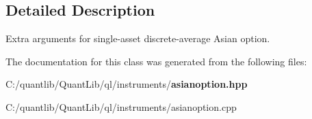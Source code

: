 \subsection{Detailed Description}
Extra arguments for single-\/asset discrete-\/average Asian option. 

The documentation for this class was generated from the following files\+:\begin{DoxyCompactItemize}
\item 
C\+:/quantlib/\+Quant\+Lib/ql/instruments/{\bf asianoption.\+hpp}\item 
C\+:/quantlib/\+Quant\+Lib/ql/instruments/asianoption.\+cpp\end{DoxyCompactItemize}
